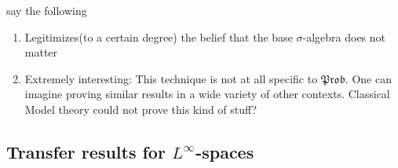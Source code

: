 \documentclass[a4paper]{amsproc}
\theoremstyle{plain}
\theoremstyle{definition}
\theoremstyle{remark}
\numberwithin{equation}{section}
\newcommand{\Prob}{\mathfrak{Prob}}
\begin{document}

say the following
\begin{enumerate}
    \item Legitimizes(to a certain degree) the belief that the base $\sigma$-algebra does not matter
    \item Extremely interesting: This technique is not at all specific to $\Prob$. One can imagine proving similar results in a wide variety of other contexts. Classical Model theory could not prove this kind of stuff?
\end{enumerate}

\subsection{Transfer results for $L^\infty$-spaces}
\end{document}
